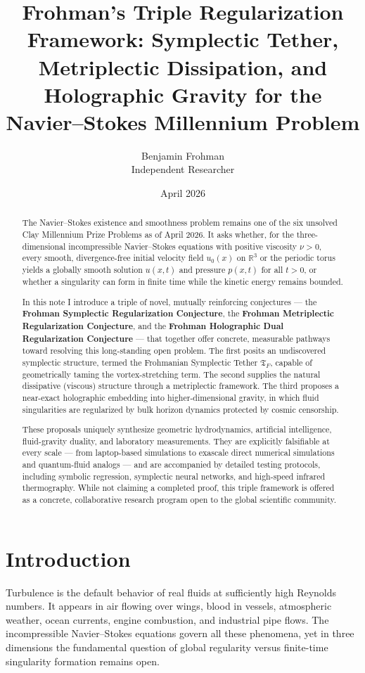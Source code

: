 \documentclass[11pt,a4paper]{article}
\title{\textbf{Frohman’s Triple Regularization Framework: Symplectic Tether, Metriplectic Dissipation, and Holographic Gravity for the Navier--Stokes Millennium Problem}}
\author{Benjamin Frohman \\ Independent Researcher}
\date{April 2026}
\begin{document}
\maketitle

\begin{abstract}
The Navier–Stokes existence and smoothness problem remains one of the six unsolved Clay Millennium Prize Problems as of April 2026. It asks whether, for the three-dimensional incompressible Navier–Stokes equations with positive viscosity \(\nu > 0\), every smooth, divergence-free initial velocity field \(u_0(x)\) on \(\mathbb{R}^3\) or the periodic torus yields a globally smooth solution \(u(x,t)\) and pressure \(p(x,t)\) for all \(t > 0\), or whether a singularity can form in finite time while the kinetic energy remains bounded.

In this note I introduce a triple of novel, mutually reinforcing conjectures — the \textbf{Frohman Symplectic Regularization Conjecture}, the \textbf{Frohman Metriplectic Regularization Conjecture}, and the \textbf{Frohman Holographic Dual Regularization Conjecture} — that together offer concrete, measurable pathways toward resolving this long-standing open problem. The first posits an undiscovered symplectic structure, termed the Frohmanian Symplectic Tether \(\mathfrak{T}_F\), capable of geometrically taming the vortex-stretching term. The second supplies the natural dissipative (viscous) structure through a metriplectic framework. The third proposes a near-exact holographic embedding into higher-dimensional gravity, in which fluid singularities are regularized by bulk horizon dynamics protected by cosmic censorship. 

These proposals uniquely synthesize geometric hydrodynamics, artificial intelligence, fluid-gravity duality, and laboratory measurements. They are explicitly falsifiable at every scale — from laptop-based simulations to exascale direct numerical simulations and quantum-fluid analogs — and are accompanied by detailed testing protocols, including symbolic regression, symplectic neural networks, and high-speed infrared thermography. While not claiming a completed proof, this triple framework is offered as a concrete, collaborative research program open to the global scientific community.
\end{abstract}

\section{Introduction}
Turbulence is the default behavior of real fluids at sufficiently high Reynolds numbers. It appears in air flowing over wings, blood in vessels, atmospheric weather, ocean currents, engine combustion, and industrial pipe flows. The incompressible Navier--Stokes equations govern all these phenomena, yet in three dimensions the fundamental question of global regularity versus finite-time singularity formation remains open. 
\end{document}
